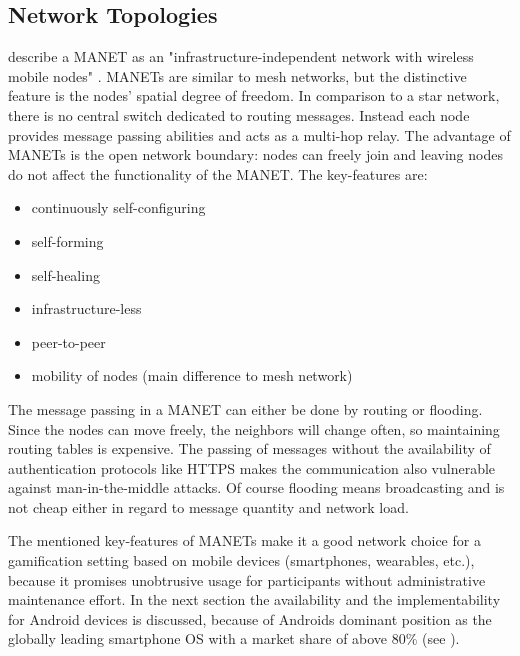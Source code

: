 \subsection{Network Topologies}
\label{Network Topologies}

\textcite{Dorri2015} describe a \gls{MANET} as an "infrastructure-independent network with wireless mobile nodes" \autocite[p. 15]{Dorri2015}. \glspl{MANET} are similar to mesh networks, but the distinctive feature is the nodes' spatial degree of freedom. In comparison to a star network, there is no central switch dedicated to routing messages. Instead each node provides message passing abilities and acts as a multi-hop relay.
The advantage of \glspl{MANET} is the open network boundary: nodes can freely join and leaving nodes do not affect the functionality of the \gls{MANET}. The key-features are:

\begin{itemize}  
	\item continuously self-configuring
	\item self-forming
	\item self-healing
	\item infrastructure-less
	\item peer-to-peer
	\item  mobility of nodes (main difference to mesh network)
\end{itemize}

The message passing in a \gls{MANET} can either be done by routing or flooding. Since the nodes can move freely, the neighbors will change often, so maintaining routing tables is expensive. The passing of messages without the availability of authentication protocols like \gls{HTTPS} makes the communication also vulnerable against man-in-the-middle attacks. Of course flooding means broadcasting and is not cheap either in regard to message quantity and network load.

The mentioned key-features of \glspl{MANET} make it a good network choice for a gamification setting based on mobile devices (smartphones, wearables, etc.), because it promises unobtrusive usage for participants without administrative maintenance effort. In the next section the availability and the implementability for Android devices is discussed, because of Androids dominant position as the globally leading smartphone \gls{OS} with a market share of above 80\% (see \textcite{Online:Gartner2016}). 

